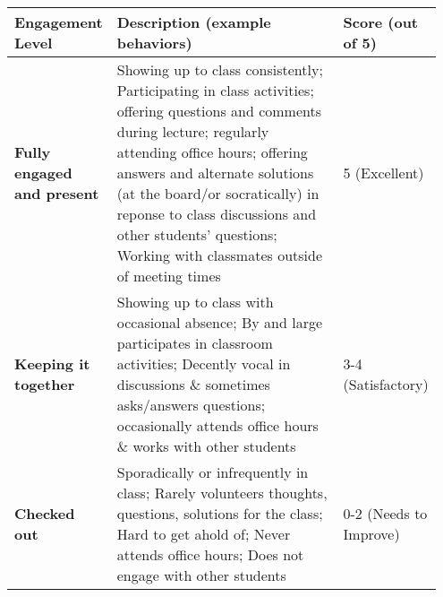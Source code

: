 \documentclass[10pt, oneside]{article}
\begin{document}
\begin{tabular}{p{0.2\linewidth} | p{0.55\linewidth}| p{0.2\linewidth}}
			\hline
	Engagement Level  & Description (example behaviors) & Score (out of 5) \\
		\hline
				\hline
	\textbf{Fully engaged and present}  & Showing up to class consistently; Participating in class activities; offering questions and comments during lecture; regularly attending office hours; offering answers and alternate solutions (at the board/or socratically) in reponse to class discussions and other students' questions; Working with classmates outside of meeting times  & 5 (Excellent) \\
	\textbf{Keeping it together}  & Showing up to class with occasional absence; By and large participates in classroom activities; Decently vocal in discussions \& sometimes asks/answers questions; occasionally attends office hours \& works with other students & 3-4 (Satisfactory) \\
\textbf{Checked out} & Sporadically or infrequently in class; Rarely volunteers thoughts, questions, solutions for the class; Hard to get ahold of; Never attends office hours; Does not engage with other students & 0-2 (Needs to Improve)\\
		\hline
\end{tabular}
 
\end{document}
